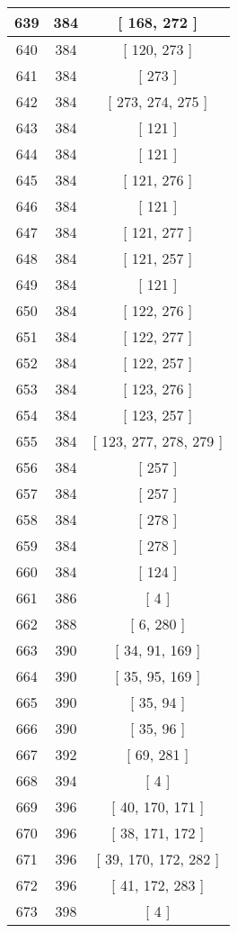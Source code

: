 \begin{center}
\begin{longtable}[H]{|| c c c ||}
\hline
639 & 384 & [ 168, 272 ] \\ 
\hline
640 & 384 & [ 120, 273 ] \\ 
\hline
641 & 384 & [ 273 ] \\ 
\hline
642 & 384 & [ 273, 274, 275 ] \\ 
\hline
643 & 384 & [ 121 ] \\ 
\hline
644 & 384 & [ 121 ] \\ 
\hline
645 & 384 & [ 121, 276 ] \\ 
\hline
646 & 384 & [ 121 ] \\ 
\hline
647 & 384 & [ 121, 277 ] \\ 
\hline
648 & 384 & [ 121, 257 ] \\ 
\hline
649 & 384 & [ 121 ] \\ 
\hline
650 & 384 & [ 122, 276 ] \\ 
\hline
651 & 384 & [ 122, 277 ] \\ 
\hline
652 & 384 & [ 122, 257 ] \\ 
\hline
653 & 384 & [ 123, 276 ] \\ 
\hline
654 & 384 & [ 123, 257 ] \\ 
\hline
655 & 384 & [ 123, 277, 278, 279 ] \\ 
\hline
656 & 384 & [ 257 ] \\ 
\hline
657 & 384 & [ 257 ] \\ 
\hline
658 & 384 & [ 278 ] \\ 
\hline
659 & 384 & [ 278 ] \\ 
\hline
660 & 384 & [ 124 ] \\ 
\hline
661 & 386 & [ 4 ] \\ 
\hline
662 & 388 & [ 6, 280 ] \\ 
\hline
663 & 390 & [ 34, 91, 169 ] \\ 
\hline
664 & 390 & [ 35, 95, 169 ] \\ 
\hline
665 & 390 & [ 35, 94 ] \\ 
\hline
666 & 390 & [ 35, 96 ] \\ 
\hline
667 & 392 & [ 69, 281 ] \\ 
\hline
668 & 394 & [ 4 ] \\ 
\hline
669 & 396 & [ 40, 170, 171 ] \\ 
\hline
670 & 396 & [ 38, 171, 172 ] \\ 
\hline
671 & 396 & [ 39, 170, 172, 282 ] \\ 
\hline
672 & 396 & [ 41, 172, 283 ] \\ 
\hline
673 & 398 & [ 4 ] \\ 

\end{longtable}
\end{center}
